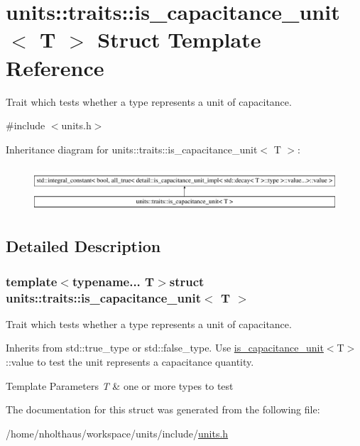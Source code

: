\hypertarget{structunits_1_1traits_1_1is__capacitance__unit}{}\section{units\+:\+:traits\+:\+:is\+\_\+capacitance\+\_\+unit$<$ T $>$ Struct Template Reference}
\label{structunits_1_1traits_1_1is__capacitance__unit}


Trait which tests whether a type represents a unit of capacitance.  




{\ttfamily \#include $<$units.\+h$>$}

Inheritance diagram for units\+:\+:traits\+:\+:is\+\_\+capacitance\+\_\+unit$<$ T $>$\+:\begin{figure}[H]
\begin{center}
\leavevmode
\includegraphics[height=1.694402cm]{structunits_1_1traits_1_1is__capacitance__unit}
\end{center}
\end{figure}


\subsection{Detailed Description}
\subsubsection*{template$<$typename... T$>$struct units\+::traits\+::is\+\_\+capacitance\+\_\+unit$<$ T $>$}

Trait which tests whether a type represents a unit of capacitance. 

Inherits from {\ttfamily std\+::true\+\_\+type} or {\ttfamily std\+::false\+\_\+type}. Use {\ttfamily \hyperlink{structunits_1_1traits_1_1is__capacitance__unit}{is\+\_\+capacitance\+\_\+unit}$<$T$>$\+::value} to test the unit represents a capacitance quantity. 
\begin{DoxyTemplParams}{Template Parameters}
{\em T} & one or more types to test \\
\hline
\end{DoxyTemplParams}


The documentation for this struct was generated from the following file\+:\begin{DoxyCompactItemize}
\item 
/home/nholthaus/workspace/units/include/\hyperlink{units_8h}{units.\+h}\end{DoxyCompactItemize}
